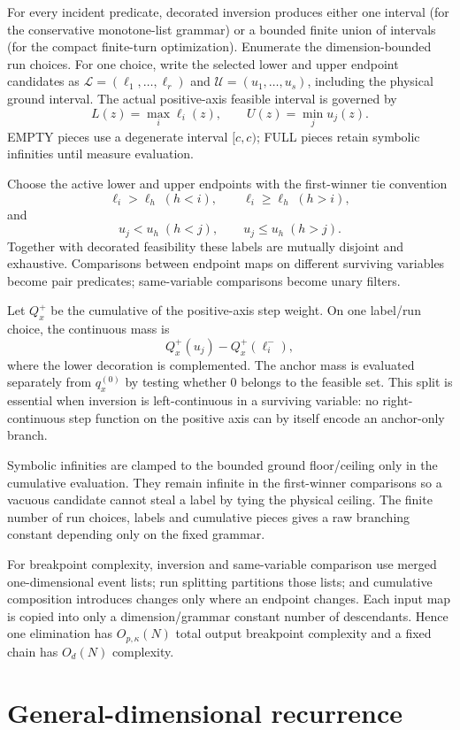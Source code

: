 \documentclass[12pt,a4paper]{article}
\theoremstyle{definition}
\newcommand{\1}{\mathbf 1}
\begin{document}
For every incident predicate, decorated inversion produces either one interval (for the conservative monotone-list grammar) or a bounded finite union of intervals (for the compact finite-turn optimization). Enumerate the dimension-bounded run choices. For one choice, write the selected lower and upper endpoint candidates as $\mathcal L=(\ell_1,\ldots,\ell_r)$ and $\mathcal U=(u_1,\ldots,u_s)$, including the physical ground interval. The actual positive-axis feasible interval is governed by
\[
L(z)=\max_i\ell_i(z),\qquad U(z)=\min_j u_j(z).
\]
EMPTY pieces use a degenerate interval $[c,c)$; FULL pieces retain symbolic infinities until measure evaluation.

Choose the active lower and upper endpoints with the first-winner tie convention
\[
\ell_i>\ell_h\;(h<i),\qquad \ell_i\ge\ell_h\;(h>i),
\]
and
\[
u_j<u_h\;(h<j),\qquad u_j\le u_h\;(h>j).
\]
Together with decorated feasibility these labels are mutually disjoint and exhaustive. Comparisons between endpoint maps on different surviving variables become pair predicates; same-variable comparisons become unary filters.

Let $Q_x^+$ be the cumulative of the positive-axis step weight. On one label/run choice, the continuous mass is
\[
Q_x^+(u_j)-Q_x^+(\ell_i^-),
\]
where the lower decoration is complemented. The anchor mass is evaluated separately from $q_x^{(0)}$ by testing whether $0$ belongs to the feasible set. This split is essential when inversion is left-continuous in a surviving variable: no right-continuous step function on the positive axis can by itself encode an anchor-only branch.

Symbolic infinities are clamped to the bounded ground floor/ceiling only in the cumulative evaluation. They remain infinite in the first-winner comparisons so a vacuous candidate cannot steal a label by tying the physical ceiling. The finite number of run choices, labels and cumulative pieces gives a raw branching constant depending only on the fixed grammar.

For breakpoint complexity, inversion and same-variable comparison use merged one-dimensional event lists; run splitting partitions those lists; and cumulative composition introduces changes only where an endpoint changes. Each input map is copied into only a dimension/grammar constant number of descendants. Hence one elimination has $O_{p,\kappa}(N)$ total output breakpoint complexity and a fixed chain has $O_d(N)$ complexity.

\section{General-dimensional recurrence}                         \label{app:generaldrecurrence}
\end{document}
